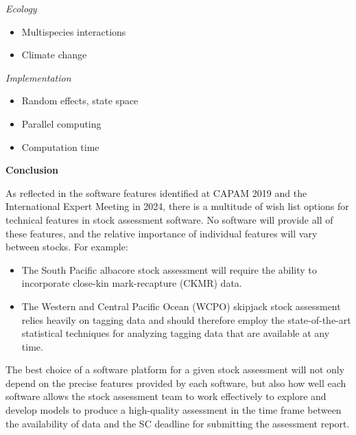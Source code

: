 \documentclass{SCreport}
\begin{document}
\vspace{1ex}

\textit{Ecology}

\begin{itemize}
  \item Multispecies interactions\\[-4.5ex]
  \item Climate change
\end{itemize}

\vspace{1ex}

\textit{Implementation}

\begin{itemize}
  \item Random effects, state space\\[-4.5ex]
  \item Parallel computing\\[-4.5ex]
  \item Computation time
\end{itemize}

\newpage

\textbf{Conclusion}

As reflected in the software features identified at CAPAM 2019 and the
International Expert Meeting in 2024, there is a multitude of wish list options
for technical features in stock assessment software. No software will provide
all of these features, and the relative importance of individual features will
vary between stocks. For example:

\begin{itemize}
  \item The South Pacific albacore stock assessment will require the ability to
  incorporate close-kin mark-recapture (CKMR) data.
  \item The Western and Central Pacific Ocean (WCPO) skipjack stock assessment
  relies heavily on tagging data and should therefore employ the
  state-of-the-art statistical techniques for analyzing tagging data that are
  available at any time.
\end{itemize}

The best choice of a software platform for a given stock assessment will not
only depend on the precise features provided by each software, but also how well
each software allows the stock assessment team to work effectively to explore
and develop models to produce a high-quality assessment in the time frame
between the availability of data and the SC deadline for submitting the
assessment report.
\end{document}
